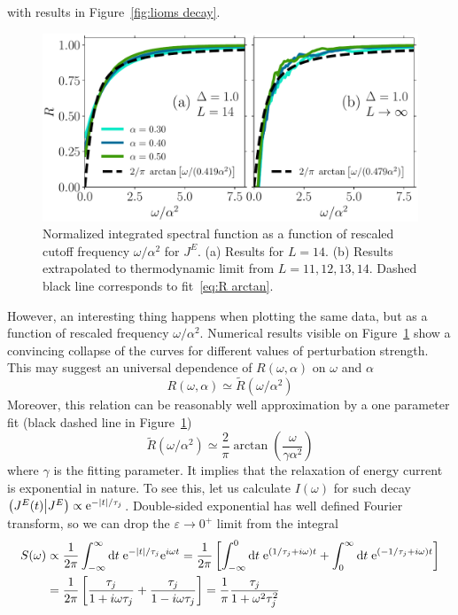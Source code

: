 with results in Figure~\ref{fig:lioms decay}.
\begin{figure}[ht]
  \centering
  \includegraphics[width=\figsize\textwidth]{Figures/current_scaling_small.pdf}
  \caption{Normalized integrated spectral function as a function of rescaled cutoff frequency \(\omega/\alpha^2\)
   for \(J^E\). (a) Results for \(L=14\). (b) Results extrapolated to thermodynamic limit from \(L=11,12,13,14\).
  Dashed black line corresponds to fit~\eqref{eq:R arctan}.}
  \label{fig:current decay scaling}
\end{figure}
However, an interesting thing happens when plotting the same data, but as a function of rescaled
frequency \(\omega/\alpha^2\). Numerical results visible on Figure~\ref{fig:current decay scaling}
show a convincing collapse of the curves for different values of perturbation strength. This may suggest
an universal dependence of \(R(\omega,\alpha)\) on \(\omega\) and \(\alpha\)
\begin{equation}
  R(\omega,\alpha)\simeq \tilde{R}(\omega/\alpha^2)
  \label{eq:universal scaling current}
\end{equation}
Moreover, this relation can be reasonably well approximation by a one parameter fit
(black dashed line in Figure~\ref{fig:current decay scaling})
\begin{equation}
  \tilde{R}(\omega/\alpha^2) \simeq \frac{2}{\pi} \arctan\left(\frac{\omega}{\gamma \alpha^2}\right)
\label{eq:R arctan}
\end{equation}
where \(\gamma \) is the fitting parameter. It implies that the relaxation of energy current
is exponential in nature. To see this, let us calculate \(I(\omega)\) for such decay
\(\left(J^E(t) \middle| J^E\right) \propto \mathrm{e}^{-\abs{t}/\tau_{j}}\). Double-sided exponential has well defined Fourier
transform, so we can drop the \(\varepsilon \to 0^{+}\) limit from the integral
\begin{align}
  S(\omega) &\propto \frac{1}{2\pi} \int_{-\infty}^{\infty} \mathrm{d} t\; \mathrm{e}^{-\abs{t}/\tau_{j}} \mathrm{e}^{i \omega t} = 
  \frac{1}{2\pi} \left[\int_{-\infty}^{0} \mathrm{d} t\; \mathrm{e}^{(1/\tau_{j} + i\omega)t }
  + \int_{0}^{\infty} \mathrm{d} t\; \mathrm{e}^{(-1/\tau_{j} + i\omega)t }  \right] \nonumber \\
  &= \frac{1}{2\pi} \left[\frac{\tau_{j}}{1+i\omega \tau_{j}} + \frac{\tau_{j}}{1-i\omega\tau_{j}}\right] = 
  \frac{1}{\pi} \frac{\tau_{j}}{1+\omega^2\tau_{j}^2}
\end{align}

